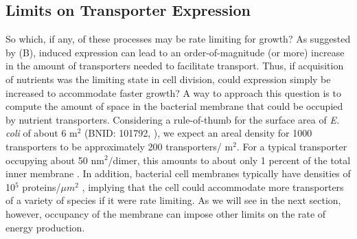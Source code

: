 \subsection{Limits on Transporter Expression}
So which, if any, of these processes may be rate limiting for growth? As
suggested by  (B), induced expression can lead to an
order-of-magnitude (or more) increase in the amount of transporters needed to
facilitate transport. Thus, if acquisition of nutrients was the limiting state
in cell division, could expression simply be increased to accommodate faster
growth? A way to approach this question is to compute the amount of space in the
bacterial membrane that could be occupied by nutrient transporters. Considering a rule-of-thumb for the surface area of
\textit{E. coli} of about 6 \textmu m$^2$ (BNID: 101792, \cite{milo2010}), we expect
an areal density for 1000 transporters to be approximately 200
transporters/ \textmu m$^2$. For a typical transporter occupying about 50
nm$^2$/dimer, this amounts to about only 1 percent of the total inner membrane
\citep{szenk2017}. In addition, bacterial cell membranes typically have
densities of 10$^5$ proteins/$\mu m^2$ \citep{phillips2018}, implying that the
cell could accommodate more transporters of a variety of species if it were rate
limiting. As we will see in the next section, however, occupancy of the membrane can
impose other limits on the rate of energy production.
